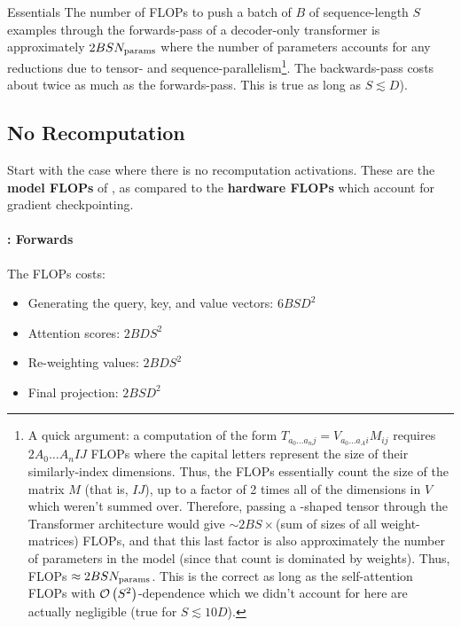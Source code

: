 \documentclass[11pt]{article}
\begin{document}
\begin{nicebox}{Essentials}
	The number of FLOPs to push a batch of $ B $ of sequence-length $ S $ examples through the forwards-pass
	of a decoder-only transformer is approximately $ 2BS N _{ {\rm params}  } $ where the number of
	parameters accounts for any reductions due to tensor- and sequence-parallelism\footnote{A quick argument: a
	computation of the form $T _{ a _{ 0 }\ldots  a _{ n }j } =V _{ a _{ 0 }\ldots a _{ A
			}i }M _{ ij } $ requires $ 2A _{ 0 }\ldots A _{ n }IJ $ FLOPs where the capital letters
	represent the size of their similarly-index dimensions. Thus, the FLOPs
	essentially count the size of the matrix $ M $ (that is, $ IJ $), up to a factor of 2 times all of the
	dimensions in $ V $ which weren't summed over. Therefore, passing a
	-shaped tensor through the Transformer architecture would give $ \sim 2BS\times
	$(sum of sizes of all weight-matrices) FLOPs, and that this last factor is also approximately the number of
	parameters in the model (since that count is dominated by weights). Thus, FLOPs $ \approx 2BSN _{
				{\rm params}  } $. This is the correct as long as the self-attention FLOPs with $ \mathcal{O} \left( S ^{ 2 } \right)$-dependence which we
	didn't account for here are actually negligible (true for $ S \lesssim 10  D $).}. The backwards-pass
	costs about twice as much as the forwards-pass. This is true as long as $ S \lesssim D $).
\end{nicebox}



\subsection{No Recomputation}

Start with the case where there is no recomputation activations.  These are the \textbf{model FLOPs} of
\cite{korthikanti2022reducing}, as compared to the \textbf{hardware FLOPs} which account for gradient
checkpointing.


\paragraph{: Forwards }

The FLOPs costs:
\begin{itemize}
	\item  Generating the query, key, and value vectors: $ 6BSD ^{ 2 } $
	\item Attention scores:  $2BDS ^{ 2 }$
	\item Re-weighting values:  $2BDS ^{ 2 }$
	\item Final projection: $ 2BSD ^{ 2 } $
\end{itemize}
\end{document}
